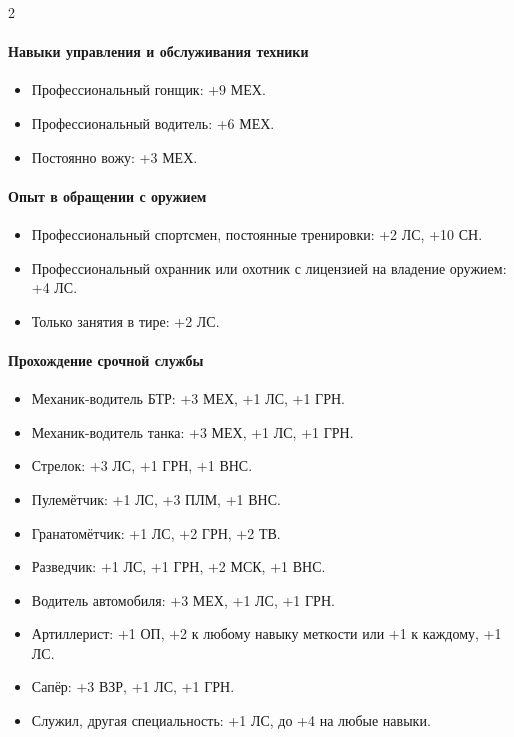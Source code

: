 \documentclass[twoside]{article}
\begin{document}
\begin{multicols}{2}
\paragraph{Навыки управления и обслуживания техники}\label{vehicle-skills}

\begin{itemize}
\item
  Профессиональный гонщик: +9 МЕХ.
\item
  Профессиональный водитель: +6 МЕХ.
\item
  Постоянно вожу: +3 МЕХ.
\end{itemize}

\paragraph{Опыт в обращении с оружием}\label{weapon-experience}

\begin{itemize}
\item
  Профессиональный спортсмен, постоянные тренировки: +2 ЛС, +10 СН.
\item
  Профессиональный охранник или охотник с лицензией на владение оружием:
  +4 ЛС.
\item
  Только занятия в тире: +2 ЛС.
\end{itemize}

\paragraph{Прохождение срочной службы}\label{military-service}

\begin{itemize}
\item
  Механик-водитель БТР: +3 МЕХ, +1 ЛС, +1 ГРН.
\item
  Механик-водитель танка: +3 МЕХ, +1 ЛС, +1 ГРН.
\item
  Стрелок: +3 ЛС, +1 ГРН, +1 ВНС.
\item
  Пулемётчик: +1 ЛС, +3 ПЛМ, +1 ВНС.
\item
  Гранатомётчик: +1 ЛС, +2 ГРН, +2 ТВ.
\item
  Разведчик: +1 ЛС, +1 ГРН, +2 МСК, +1 ВНС.
\item
  Водитель автомобиля: +3 МЕХ, +1 ЛС, +1 ГРН.
\item
  Артиллерист: +1 ОП, +2 к любому навыку меткости или +1 к каждому, +1 ЛС.
\item
  Сапёр: +3 ВЗР, +1 ЛС, +1 ГРН.
\item
  Служил, другая специальность: +1 ЛС, до +4 на любые навыки.
\end{itemize}


\end{multicols}
\end{document}
